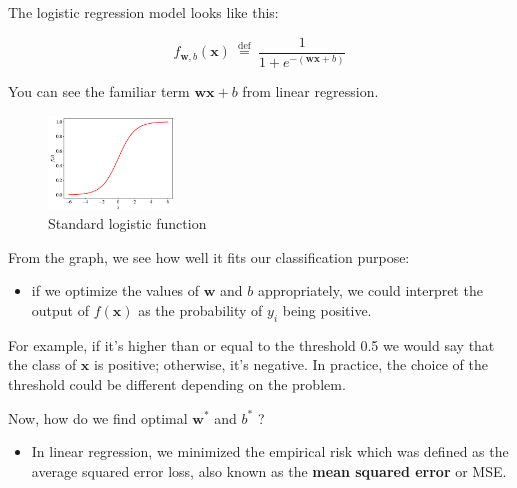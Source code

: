 \documentclass[9pt,dvipsnames]{beamer}
\begin{document}
\begin{frame}
	The logistic regression model looks like this:
	
	$$
	f_{\mathbf{w}, b}(\mathbf{x}) \stackrel{\text { def }}{=} \frac{1}{1+e^{-(\mathbf{w} \mathbf{x}+b)}}
	$$
	
	You can see the familiar term $\mathbf{w} \mathbf{x}+b$ from linear regression.
	\begin{figure}
		\centering
		\includegraphics[width=0.3\textwidth]{imgs/algorithm_3.jpg}
		\caption{Standard logistic function}
	\end{figure}
	From the graph, we see how well it fits our classification purpose: 
	\begin{itemize}
		\item if we optimize the values of $\mathbf{w}$ and $b$ appropriately, we could interpret the output of $f(\mathbf{x})$ as the probability of $y_{i}$ being positive. 
	\end{itemize}
	For example, if it's higher than or equal to the threshold 0.5 we would say that the class of $\mathbf{x}$ is positive; otherwise, it's negative. In practice, the choice of the threshold could be different depending on the problem.
\end{frame}

\begin{frame}
	Now, how do we find optimal $\mathbf{w}^{*}$ and $b^{*}$ ? 
	\begin{itemize}
		\item In linear regression, we minimized the empirical risk which was defined as the average squared error loss, also known as the \textbf{mean squared error} or MSE.
	\end{itemize}
\end{frame}
\end{document}
